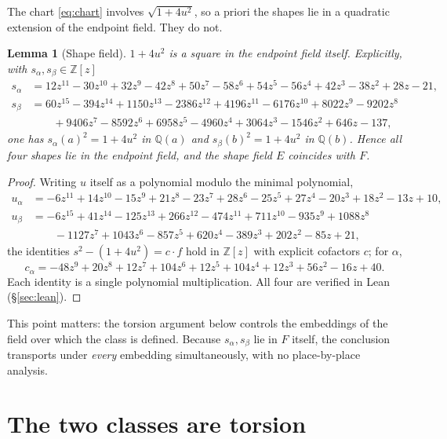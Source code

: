 \documentclass[11pt]{article}
\newtheorem{lemma}[theorem]{Lemma}
\theoremstyle{remark}
\newcommand{\QQ}{\mathbb{Q}}
\newcommand{\ZZ}{\mathbb{Z}}
\begin{document}
The chart \eqref{eq:chart} involves $\sqrt{1+4u^2}$, so a priori the shapes lie
in a quadratic extension of the endpoint field. They do not.

\begin{lemma}[Shape field]\label{lem:shapefield}
$1+4u^2$ is a square in the endpoint field itself. Explicitly, with
$s_\alpha,s_\beta\in\ZZ[z]$
\[
\begin{aligned}
s_\alpha&=12z^{11}-30z^{10}+32z^{9}-42z^{8}+50z^{7}-58z^{6}+54z^{5}-56z^{4}
+42z^{3}-38z^{2}+28z-21,\\
s_\beta&=60z^{15}-394z^{14}+1150z^{13}-2386z^{12}+4196z^{11}-6176z^{10}
+8022z^{9}-9202z^{8}\\
&\qquad+9406z^{7}-8592z^{6}+6958z^{5}-4960z^{4}+3064z^{3}-1546z^{2}+646z-137,
\end{aligned}
\]
one has $s_\alpha(a)^2=1+4u^2$ in $\QQ(a)$ and $s_\beta(b)^2=1+4u^2$ in
$\QQ(b)$. Hence all four shapes lie in the endpoint field, and the shape field
$E$ coincides with $F$.
\end{lemma}

\begin{proof}
Writing $u$ itself as a polynomial modulo the minimal polynomial,
\[
\begin{aligned}
u_\alpha&=-6z^{11}+14z^{10}-15z^{9}+21z^{8}-23z^{7}+28z^{6}-25z^{5}+27z^{4}
-20z^{3}+18z^{2}-13z+10,\\
u_\beta&=-6z^{15}+41z^{14}-125z^{13}+266z^{12}-474z^{11}+711z^{10}-935z^{9}
+1088z^{8}\\
&\qquad-1127z^{7}+1043z^{6}-857z^{5}+620z^{4}-389z^{3}+202z^{2}-85z+21,
\end{aligned}
\]
the identities $s^2-(1+4u^2)=c\cdot f$ hold in $\ZZ[z]$ with explicit cofactors
$c$; for $\alpha$,
\[
c_\alpha=-48z^{9}+20z^{8}+12z^{7}+104z^{6}+12z^{5}+104z^{4}+12z^{3}+56z^{2}
-16z+40 .
\]
Each identity is a single polynomial multiplication. All four are verified in
Lean (\S\ref{sec:lean}).
\end{proof}

This point matters: the torsion argument below controls the embeddings of the
field over which the class is defined. Because $s_\alpha,s_\beta$ lie in $F$
itself, the conclusion transports under \emph{every} embedding simultaneously,
with no place-by-place analysis.

\section{The two classes are torsion}
\end{document}
